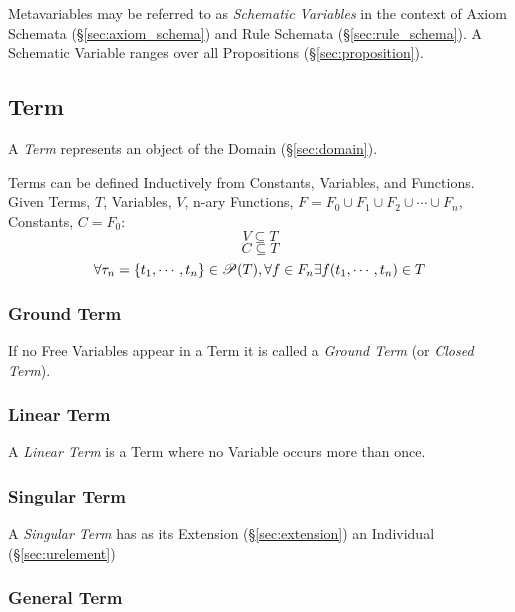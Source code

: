 Metavariables may be referred to as \emph{Schematic Variables} in the
context of Axiom Schemata (\S\ref{sec:axiom_schema}) and Rule Schemata
(\S\ref{sec:rule_schema}). A Schematic Variable ranges over all
Propositions (\S\ref{sec:proposition}).



\subsection{Term}\label{sec:term}

A \emph{Term} represents an object of the Domain (\S\ref{sec:domain}).

Terms can be defined Inductively from Constants, Variables, and
Functions. Given Terms, $T$, Variables, $V$, n-ary Functions, $F = F_0
\cup F_1 \cup F_2 \cup \cdots \cup F_n$, Constants, $C = F_0$:
\[
  V \subseteq T
\]\[
  C \subseteq T
\]\[
  \forall \tau_n=\{t_1,\cdots,t_n\} \in \mathscr{P}(T), \forall f
  \in F_n \exists f(t_1,\cdots,t_n) \in T
\]



\subsubsection{Ground Term}\label{sec:ground_term}

If no Free Variables appear in a Term it is called a \emph{Ground
  Term} (or \emph{Closed Term}).



\subsubsection{Linear Term}\label{sec:linear_term}

A \emph{Linear Term} is a Term where no Variable occurs more than
once.



\subsubsection{Singular Term}\label{sec:singular_term}
\cite{chalmers02}

A \emph{Singular Term} has as its Extension (\S\ref{sec:extension}) an
Individual (\S\ref{sec:urelement})



\subsubsection{General Term}\label{sec:general_term}
\cite{chalmers02}

